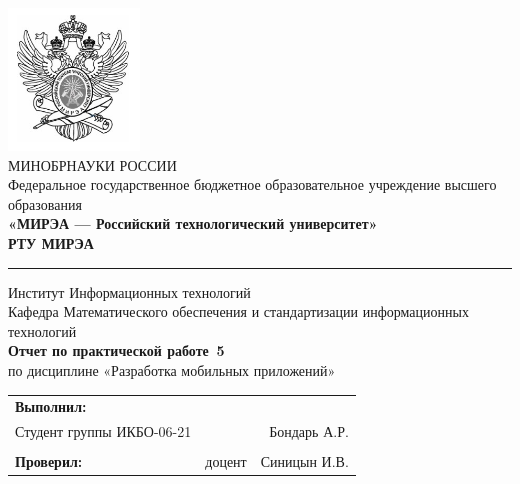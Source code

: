 \begin{titlepage}
	
	\thispagestyle{fancy}
	\renewcommand{\headrulewidth}{0pt}

	\begin{center}
		\includegraphics[scale=0.5]{./res/logo}\\ %
		МИНОБРНАУКИ РОССИИ\\
		Федеральное государственное бюджетное образовательное
		учреждение высшего образования\\
		\textbf{«МИРЭА --- Российский технологический университет»}\\
		\textbf{\large РТУ МИРЭА}\\
		\bigskip \hrule \smallskip
		Институт Информационных технологий\\
		\vfill
		Кафедра Математического обеспечения и стандартизации
		информационных технологий\\
		\vfill
		\textbf{\large Отчет по практической работе \No\,5}\\
		по дисциплине «Разработка мобильных приложений»\\
		\vfill
		\vfill
		\begin{tabular}{lrr}
			\textbf{Выполнил:} & &\\
			Студент группы ИКБО-06-21 & & Бондарь А.Р. \\\\
			\textbf{Проверил:} &  доцент & Синицын И.В. \\
		\end{tabular}
		\vfill
	\end{center}
\end{titlepage}
\setcounter{page}{2}
\clearpage

